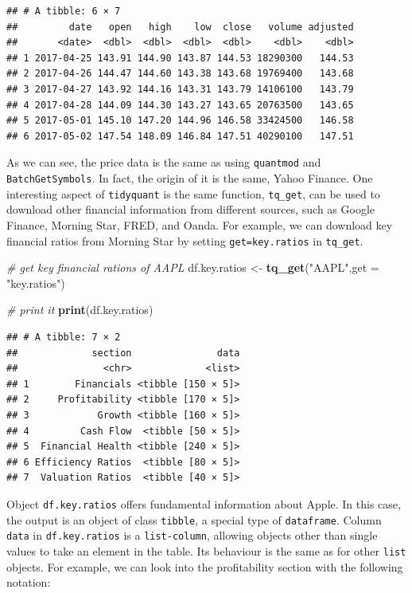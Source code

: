 \documentclass[11pt,]{book}
\newenvironment{Shaded}{\begin{snugshade}}{\end{snugshade}}
\newcommand{\KeywordTok}[1]{\textcolor[rgb]{0.27,0.27,0.27}{\textbf{#1}}}
\newcommand{\DataTypeTok}[1]{\textcolor[rgb]{0.27,0.27,0.27}{#1}}
\newcommand{\StringTok}[1]{\textcolor[rgb]{0.5,0.5,0.5}{#1}}
\newcommand{\CommentTok}[1]{\textcolor[rgb]{0.56,0.35,0.01}{\textit{#1}}}
\newcommand{\NormalTok}[1]{#1}
\begin{document}
\begin{verbatim}
## # A tibble: 6 × 7
##         date   open   high    low  close   volume adjusted
##       <date>  <dbl>  <dbl>  <dbl>  <dbl>    <dbl>    <dbl>
## 1 2017-04-25 143.91 144.90 143.87 144.53 18290300   144.53
## 2 2017-04-26 144.47 144.60 143.38 143.68 19769400   143.68
## 3 2017-04-27 143.92 144.16 143.31 143.79 14106100   143.79
## 4 2017-04-28 144.09 144.30 143.27 143.65 20763500   143.65
## 5 2017-05-01 145.10 147.20 144.96 146.58 33424500   146.58
## 6 2017-05-02 147.54 148.09 146.84 147.51 40290100   147.51
\end{verbatim}

As we can see, the price data is the same as using \texttt{quantmod} and
\texttt{BatchGetSymbols}. In fact, the origin of it is the same, Yahoo
Finance. One interesting aspect of \texttt{tidyquant} is the same
function, \texttt{tq\_get}, can be used to download other financial
information from different sources, such as Google Finance, Morning
Star, FRED, and Oanda. For example, we can download key financial ratios
from Morning Star by setting
\texttt{get=\textquotesingle{}key.ratios\textquotesingle{}} in
\texttt{tq\_get}. 

\begin{Shaded}
\begin{Highlighting}[]
\CommentTok{# get key financial rations of AAPL}
\NormalTok{df.key.ratios <-}\StringTok{ }\KeywordTok{tq_get}\NormalTok{(}\StringTok{"AAPL"}\NormalTok{,}\DataTypeTok{get =} \StringTok{"key.ratios"}\NormalTok{)}

\CommentTok{# print it}
\KeywordTok{print}\NormalTok{(df.key.ratios)           }
\end{Highlighting}
\end{Shaded}

\begin{verbatim}
## # A tibble: 7 × 2
##             section               data
##               <chr>             <list>
## 1        Financials <tibble [150 × 5]>
## 2     Profitability <tibble [170 × 5]>
## 3            Growth <tibble [160 × 5]>
## 4         Cash Flow  <tibble [50 × 5]>
## 5  Financial Health <tibble [240 × 5]>
## 6 Efficiency Ratios  <tibble [80 × 5]>
## 7  Valuation Ratios  <tibble [40 × 5]>
\end{verbatim}

Object \texttt{df.key.ratios} offers fundamental information about
Apple. In this case, the output is an object of class \texttt{tibble}, a
special type of \texttt{dataframe}. Column \texttt{data} in
\texttt{df.key.ratios} is a \texttt{list-column}, allowing objects other
than single values to take an element in the table. Its behaviour is the
same as for other \texttt{list} objects. For example, we can look into
the profitability section with the following notation:
\end{document}
